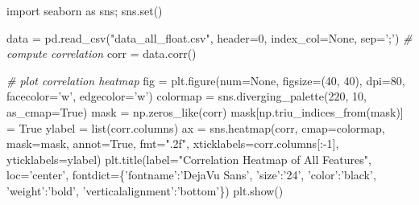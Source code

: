 \documentclass[11pt]{article}
\newenvironment{Shaded}{}{}
\newcommand{\DecValTok}[1]{\textcolor[rgb]{0.25,0.63,0.44}{{#1}}}
\newcommand{\StringTok}[1]{\textcolor[rgb]{0.25,0.44,0.63}{{#1}}}
\newcommand{\CommentTok}[1]{\textcolor[rgb]{0.38,0.63,0.69}{\textit{{#1}}}}
\newcommand{\NormalTok}[1]{{#1}}
\newcommand{\ImportTok}[1]{{#1}}
\newcommand{\VariableTok}[1]{\textcolor[rgb]{0.10,0.09,0.49}{{#1}}}
\newcommand{\OperatorTok}[1]{\textcolor[rgb]{0.40,0.40,0.40}{{#1}}}
\newcommand{\BuiltInTok}[1]{{#1}}
\begin{document}
    \begin{Shaded}
\begin{Highlighting}[]
\ImportTok{import}\NormalTok{ seaborn }\ImportTok{as}\NormalTok{ sns}\OperatorTok{;}\NormalTok{ sns.}\BuiltInTok{set}\NormalTok{()}

\NormalTok{data }\OperatorTok{=}\NormalTok{ pd.read_csv(}\StringTok{"data_all_float.csv"}\NormalTok{, header}\OperatorTok{=}\DecValTok{0}\NormalTok{, index_col}\OperatorTok{=}\VariableTok{None}\NormalTok{, sep}\OperatorTok{=}\StringTok{';'}\NormalTok{)}
\CommentTok{# compute correlation}
\NormalTok{corr }\OperatorTok{=}\NormalTok{ data.corr()}

\CommentTok{# plot correlation heatmap}
\NormalTok{fig }\OperatorTok{=}\NormalTok{ plt.figure(num}\OperatorTok{=}\VariableTok{None}\NormalTok{, figsize}\OperatorTok{=}\NormalTok{(}\DecValTok{40}\NormalTok{, }\DecValTok{40}\NormalTok{), dpi}\OperatorTok{=}\DecValTok{80}\NormalTok{, facecolor}\OperatorTok{=}\StringTok{'w'}\NormalTok{, edgecolor}\OperatorTok{=}\StringTok{'w'}\NormalTok{)}
\NormalTok{colormap }\OperatorTok{=}\NormalTok{ sns.diverging_palette(}\DecValTok{220}\NormalTok{, }\DecValTok{10}\NormalTok{, as_cmap}\OperatorTok{=}\VariableTok{True}\NormalTok{)}
\NormalTok{mask }\OperatorTok{=}\NormalTok{ np.zeros_like(corr)}
\NormalTok{mask[np.triu_indices_from(mask)] }\OperatorTok{=} \VariableTok{True}
\NormalTok{ylabel }\OperatorTok{=} \BuiltInTok{list}\NormalTok{(corr.columns)}
\NormalTok{ax }\OperatorTok{=}\NormalTok{ sns.heatmap(corr, cmap}\OperatorTok{=}\NormalTok{colormap, mask}\OperatorTok{=}\NormalTok{mask, annot}\OperatorTok{=}\VariableTok{True}\NormalTok{, fmt}\OperatorTok{=}\StringTok{".2f"}\NormalTok{, }
\NormalTok{                 xticklabels}\OperatorTok{=}\NormalTok{corr.columns[:}\OperatorTok{-}\DecValTok{1}\NormalTok{], yticklabels}\OperatorTok{=}\NormalTok{ylabel)}
\NormalTok{plt.title(label}\OperatorTok{=}\StringTok{"Correlation Heatmap of All Features"}\NormalTok{, loc}\OperatorTok{=}\StringTok{'center'}\NormalTok{, }
\NormalTok{          fontdict}\OperatorTok{=}\NormalTok{\{}\StringTok{'fontname'}\NormalTok{:}\StringTok{'DejaVu Sans'}\NormalTok{, }\StringTok{'size'}\NormalTok{:}\StringTok{'24'}\NormalTok{, }\StringTok{'color'}\NormalTok{:}\StringTok{'black'}\NormalTok{, }
                    \StringTok{'weight'}\NormalTok{:}\StringTok{'bold'}\NormalTok{, }\StringTok{'verticalalignment'}\NormalTok{:}\StringTok{'bottom'}\NormalTok{\})}
\NormalTok{plt.show()}
\end{Highlighting}
\end{Shaded}
\end{document}
